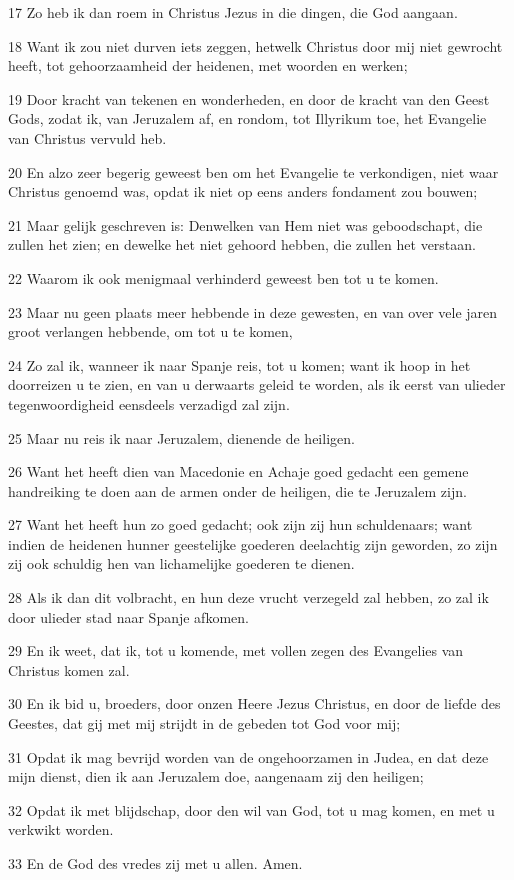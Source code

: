 \par 17 Zo heb ik dan roem in Christus Jezus in die dingen, die God aangaan.
\par 18 Want ik zou niet durven iets zeggen, hetwelk Christus door mij niet gewrocht heeft, tot gehoorzaamheid der heidenen, met woorden en werken;
\par 19 Door kracht van tekenen en wonderheden, en door de kracht van den Geest Gods, zodat ik, van Jeruzalem af, en rondom, tot Illyrikum toe, het Evangelie van Christus vervuld heb.
\par 20 En alzo zeer begerig geweest ben om het Evangelie te verkondigen, niet waar Christus genoemd was, opdat ik niet op eens anders fondament zou bouwen;
\par 21 Maar gelijk geschreven is: Denwelken van Hem niet was geboodschapt, die zullen het zien; en dewelke het niet gehoord hebben, die zullen het verstaan.
\par 22 Waarom ik ook menigmaal verhinderd geweest ben tot u te komen.
\par 23 Maar nu geen plaats meer hebbende in deze gewesten, en van over vele jaren groot verlangen hebbende, om tot u te komen,
\par 24 Zo zal ik, wanneer ik naar Spanje reis, tot u komen; want ik hoop in het doorreizen u te zien, en van u derwaarts geleid te worden, als ik eerst van ulieder tegenwoordigheid eensdeels verzadigd zal zijn.
\par 25 Maar nu reis ik naar Jeruzalem, dienende de heiligen.
\par 26 Want het heeft dien van Macedonie en Achaje goed gedacht een gemene handreiking te doen aan de armen onder de heiligen, die te Jeruzalem zijn.
\par 27 Want het heeft hun zo goed gedacht; ook zijn zij hun schuldenaars; want indien de heidenen hunner geestelijke goederen deelachtig zijn geworden, zo zijn zij ook schuldig hen van lichamelijke goederen te dienen.
\par 28 Als ik dan dit volbracht, en hun deze vrucht verzegeld zal hebben, zo zal ik door ulieder stad naar Spanje afkomen.
\par 29 En ik weet, dat ik, tot u komende, met vollen zegen des Evangelies van Christus komen zal.
\par 30 En ik bid u, broeders, door onzen Heere Jezus Christus, en door de liefde des Geestes, dat gij met mij strijdt in de gebeden tot God voor mij;
\par 31 Opdat ik mag bevrijd worden van de ongehoorzamen in Judea, en dat deze mijn dienst, dien ik aan Jeruzalem doe, aangenaam zij den heiligen;
\par 32 Opdat ik met blijdschap, door den wil van God, tot u mag komen, en met u verkwikt worden.
\par 33 En de God des vredes zij met u allen. Amen.

